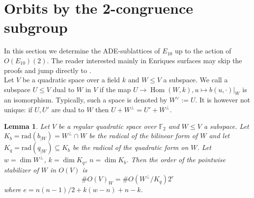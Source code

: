 \documentclass[a4paper]{amsart}
\theoremstyle{definition}
\theoremstyle{plain}
\newtheorem{lemma}[definition]{Lemma}
\DeclareMathOperator{\Hom}{Hom}
\newcommand{\FF}{\mathbb{F}}
\begin{document}
\section{Orbits by the 2-congruence subgroup}\label{sec:orbits-by-2congruence}
In this section we determine the ADE-sublattices of $E_{10}$ up to the action of $O(E_{10})(2)$.
The reader interested mainly in Enriques surfaces may skip the proofs and jump directly to .\\

Let $V$ be a quadratic space over a field $k$ and $W \leq V$ a subspace. We call a subspace $U\leq V$ dual to $W$ in $V$ if the map $U \to \Hom(W,k), u \mapsto b(u, \cdot)|_W$ is an isomorphism. Typically, such a space is denoted by $W^\vee:=U$. It is however not unique: if $U,U'$ are dual to $W$ then $U+W^\perp = U'+W^\perp$. 
\begin{lemma}\label{lemma:order_stabilizer_W_in_V}
Let $V$ be a regular quadratic space over \(\FF_2\) and $W \leq V$ a subspace. Let $K_b = \mathrm{rad}(b_{\mid W})= W^\perp \cap W$ be the radical of the bilinear form of $W$ and let $K_q =\mathrm{rad}(q_{\mid W})\subseteq K_b$ be the radical of the quadratic form on $W$.
Let $w = \dim W^\perp$, $k=\dim K_q$, $n = \dim K_b$.
Then the order of the pointwise stabilizer of $W$ in $O(V)$ is
\[\#O(V)_W = \# O(W^\perp/K_q)  2^{e}\]
where $e=n(n-1)/2 + k(w-n) + n - k$.
\end{lemma}
\end{document}
